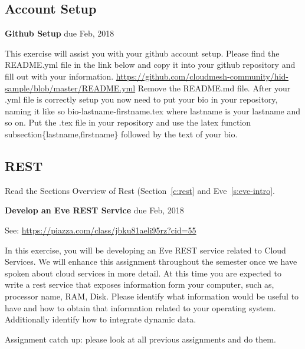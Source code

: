 \subsection{Account Setup}

\begin{exercise} {\bf Github Setup} due Feb, 2018

This exercise will assist you with your github account setup. Please
find the README.yml file in the link below and copy it into your
github repository and fill out with your
information. \url{https://github.com/cloudmesh-community/hid-sample/blob/master/README.yml}
Remove the README.md file. After your .yml file is correctly setup you
now need to put your bio in your repository, naming it like so
bio-lastname-firstname.tex where lastname is your lastname and so
on. Put the .tex file in your repository and use the latex function
subsection\{lastname,firstname\} followed by the text of your bio.


\end{exercise}

\subsection{REST}
\begin{exercise}
Read the Sections Overview of Rest (Section~\ref{c:rest} and Eve~\ref{s:eve-intro}.
\end{exercise}

\begin{exercise} {\bf Develop an Eve REST Service} due Feb, 2018

See: \url{https://piazza.com/class/jbku81aeli95rz?cid=55}

In this exercise, you will be developing an Eve REST service related
to Cloud Services. We will enhance this assignment throughout the
semester once we have spoken about cloud services in more detail. At
this time you are expected to write a rest service that exposes
information form your computer, such as, processor name, RAM,
Disk. Please identify what information would be useful to have and how
to obtain that information related to your operating
system. Additionally identify how to integrate dynamic data.


\end{exercise}

\begin{exercise}
Assignment catch up: please look at all previous assignments and do
them. 
\end{exercise}

